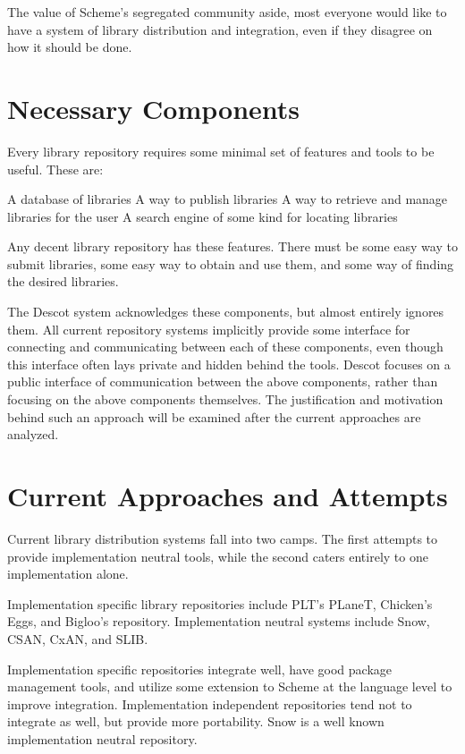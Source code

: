 The value of Scheme's segregated community aside,  most everyone
would like to have a system of library distribution
and integration, even if they disagree on how it should be done.

\section{Necessary Components}

Every library repository requires some minimal set of features and 
tools to be useful. These are:

\unorderedlist
\li A database of libraries
\li A way to publish libraries
\li A way to retrieve and manage libraries for the user
\li A search engine of some kind for locating libraries
\endunorderedlist

Any decent library repository has these features. 
There must be some easy way to submit libraries, 
some easy way to obtain and use them, 
and some way of finding the desired libraries.

The Descot\cite{descot} system acknowledges these components, 
but almost entirely ignores them. 
All current repository systems implicitly provide some interface 
for connecting and communicating between each of these components, 
even though this interface often lays private and hidden behind the 
tools. 
Descot focuses on a public interface of communication between the 
above components, rather than focusing on the above components themselves. 
The justification and motivation behind such an approach will be 
examined after the current approaches are analyzed.

\section{Current Approaches and Attempts}

Current library distribution systems fall into two camps. 
The first attempts to provide implementation neutral tools, 
while the second caters entirely to one implementation alone.

Implementation specific library repositories include PLT's 
PLaneT\cite{planet}, Chicken's Eggs\cite{eggs}, 
and Bigloo's repository\cite{bigloorepo}.  Implementation 
neutral systems include Snow\cite{snow}, CSAN\cite{csan}, 
CxAN\cite{cxan}, and SLIB\cite{slib}.

Implementation specific repositories integrate well,
have good package management tools,
and utilize some extension to Scheme at the language level to 
improve integration.
Implementation independent repositories tend 
not to integrate as well, but provide more portability.
Snow is a well known implementation 
neutral repository.

